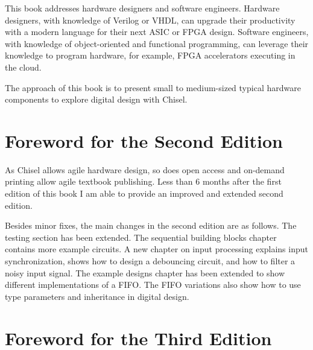 \documentclass[%
    10pt,
    headinclude, footexclude,
    openright, %
    notitlepage,
    cleardoubleempty,
    headsepline,
    pointlessnumbers,
    bibtotoc, idxtotoc,
    ]{scrbook}
\begin{document}
This book addresses hardware designers and software engineers. Hardware designers, with knowledge of Verilog or VHDL, can upgrade their productivity with a modern language for their next ASIC or FPGA design. Software engineers, with knowledge of object-oriented and functional programming, can leverage their knowledge to program hardware, for example, FPGA accelerators executing in the cloud.

The approach of this book is to present small to medium-sized typical hardware components to explore digital design with Chisel.




\section*{Foreword for the Second Edition}

As Chisel allows agile hardware design, so does open access and on-demand printing
allow agile textbook publishing. Less than 6 months after the first edition of this book
I am able to provide an improved and extended second edition.

Besides minor fixes, the main changes in the second edition are as follows.
The testing section has been extended. The sequential building blocks chapter contains
more example circuits. A new chapter on input processing explains input synchronization,
shows how to design a debouncing circuit, and how to filter a noisy input signal.
The example designs chapter has been extended to show different implementations of a FIFO.
The FIFO variations also show how to use type parameters and inheritance in digital design.

\section*{Foreword for the Third Edition}
\end{document}
